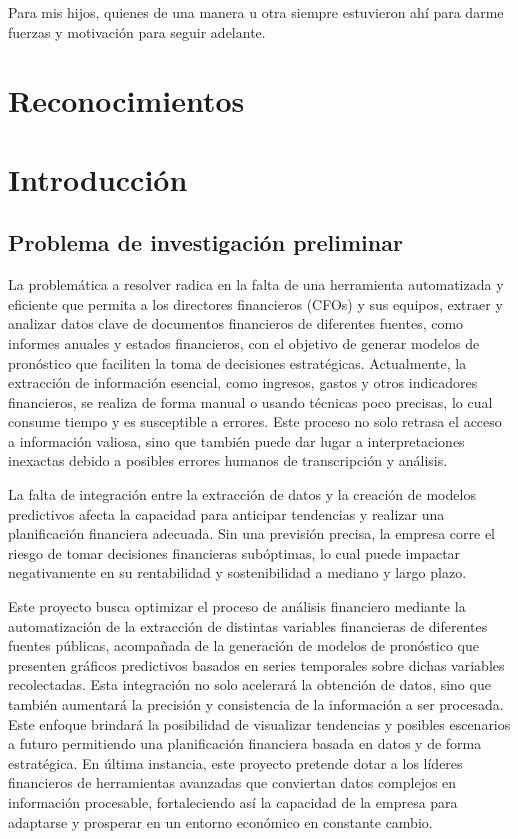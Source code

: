 \documentclass[12pt,letterpaper,oneside]{report}
\renewcommand{\_}{\UnderscoreOriginal\allowbreak}
\begin{document}
\indent Para mis hijos, quienes de una manera u otra siempre estuvieron ahí para darme fuerzas y motivación para seguir adelante.


\clearpage
\chapter*{Reconocimientos}

\clearpage
\tableofcontents
\clearpage
\listoffigures
\clearpage
\listoftables

\clearpage
{}
\setcounter{page}{1}

\chapter{Introducción}
\section{Problema de investigación preliminar}
La problemática a resolver radica en la falta de una herramienta automatizada y eficiente que permita a los directores financieros (CFOs) y sus equipos, extraer y analizar datos clave de documentos financieros de diferentes fuentes, como informes anuales y estados financieros, con el objetivo de generar modelos de pronóstico que faciliten la toma de decisiones estratégicas. Actualmente, la extracción de información esencial, como ingresos, gastos y otros indicadores financieros, se realiza de forma manual o usando técnicas poco precisas, lo cual consume tiempo y es susceptible a errores. Este proceso no solo retrasa el acceso a información valiosa, sino que también puede dar lugar a interpretaciones inexactas debido a posibles errores humanos de transcripción y análisis.

La falta de integración entre la extracción de datos y la creación de modelos predictivos afecta la capacidad para anticipar tendencias y realizar una planificación financiera adecuada. Sin una previsión precisa, la empresa corre el riesgo de tomar decisiones financieras subóptimas, lo cual puede impactar negativamente en su rentabilidad y sostenibilidad a mediano y largo plazo.

Este proyecto busca optimizar el proceso de análisis financiero mediante la automatización de la extracción de distintas variables financieras de diferentes fuentes públicas, acompañada de la generación de modelos de pronóstico que presenten gráficos predictivos basados en series temporales sobre dichas variables recolectadas. Esta integración no solo acelerará la obtención de datos, sino que también aumentará la precisión y consistencia de la información a ser procesada. Este enfoque brindará la posibilidad de visualizar tendencias y posibles escenarios a futuro permitiendo una planificación financiera basada en datos y de forma estratégica. En última instancia, este proyecto pretende dotar a los líderes financieros de herramientas avanzadas que conviertan datos complejos en información procesable, fortaleciendo así la capacidad de la empresa para adaptarse y prosperar en un entorno económico en constante cambio.
\end{document}
